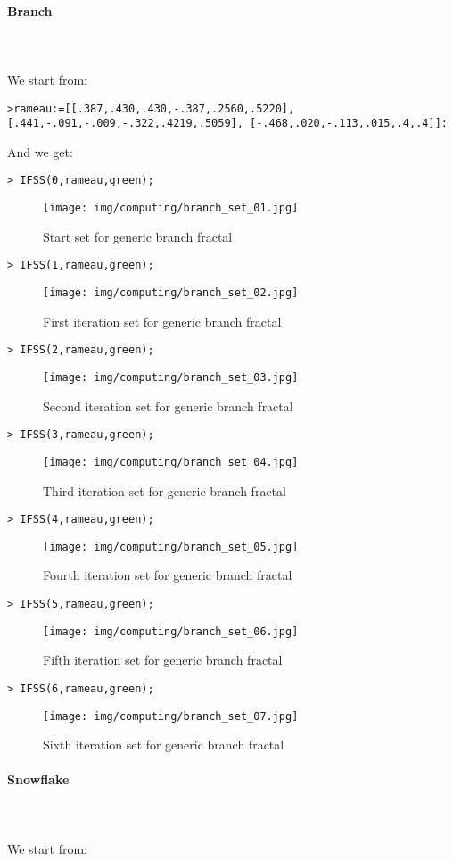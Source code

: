 	\paragraph{Branch}\mbox{}\\\\
	We start from:
	
	\texttt{>rameau:=[[.387,.430,.430,-.387,.2560,.5220], }\\
	\texttt{[.441,-.091,-.009,-.322,.4219,.5059], [-.468,.020,-.113,.015,.4,.4]]:}

	And we get:

	\texttt{> IFSS(0,rameau,green);}
	\begin{figure}[H]
		\centering
		\texttt{[image: img/computing/branch\_set\_01.jpg]}
		\caption[]{Start set for generic branch fractal}
	\end{figure}
	\texttt{> IFSS(1,rameau,green);}
	\begin{figure}[H]
		\centering
		\texttt{[image: img/computing/branch\_set\_02.jpg]}
		\caption[]{First iteration set for generic branch fractal}
	\end{figure}
	\texttt{> IFSS(2,rameau,green);}
	\begin{figure}[H]
		\centering
		\texttt{[image: img/computing/branch\_set\_03.jpg]}
		\caption[]{Second iteration set for generic branch fractal}
	\end{figure}
	\texttt{> IFSS(3,rameau,green);}
	\begin{figure}[H]
		\centering
		\texttt{[image: img/computing/branch\_set\_04.jpg]}
		\caption[]{Third iteration set for generic branch fractal}
	\end{figure}
	\texttt{> IFSS(4,rameau,green);}
	\begin{figure}[H]
		\centering
		\texttt{[image: img/computing/branch\_set\_05.jpg]}
		\caption[]{Fourth iteration set for generic branch fractal}
	\end{figure}
	\texttt{> IFSS(5,rameau,green);}
	\begin{figure}[H]
		\centering
		\texttt{[image: img/computing/branch\_set\_06.jpg]}
		\caption[]{Fifth iteration set for generic branch fractal}
	\end{figure}
	\texttt{> IFSS(6,rameau,green);}
	\begin{figure}[H]
		\centering
		\texttt{[image: img/computing/branch\_set\_07.jpg]}
		\caption[]{Sixth iteration set for generic branch fractal}
	\end{figure}
	
	\paragraph{Snowflake}\mbox{}\\\\
	We start from:
	
